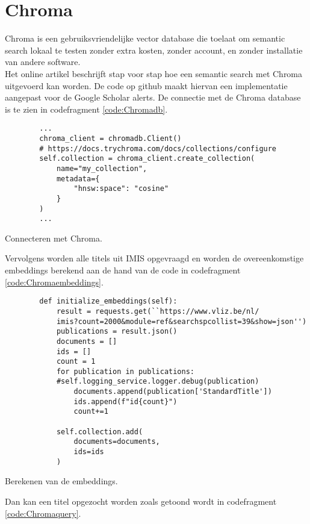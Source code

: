 \section{Chroma}
Chroma \autocite{Chroma2025} is een gebruiksvriendelijke vector database die toelaat om semantic search lokaal te testen zonder extra kosten, zonder account, en zonder installatie van andere software.\\
Het online artikel \textcite{Usechroma2025} beschrijft stap voor stap hoe een semantic search met Chroma uitgevoerd kan worden. 
De code op github \textcite{Depaepechroma2025} maakt hiervan een implementatie aangepast voor de Google Scholar alerts.
De connectie met de Chroma database is te zien in codefragment \ref{code:Chromadb}.
\begin{listing}
    \begin{verbatim}
        ...
        chroma_client = chromadb.Client()
        # https://docs.trychroma.com/docs/collections/configure
        self.collection = chroma_client.create_collection(
            name="my_collection",
            metadata={
                "hnsw:space": "cosine"
            }
        )
        ...
    \end{verbatim}
    \caption[Connect Chroma]{Connecteren met Chroma.}
    \label{code:Chromadb}
\end{listing}
Vervolgens worden alle titels uit IMIS opgevraagd en worden de overeenkomstige embeddings berekend aan de hand van de code in codefragment \ref{code:Chromaembeddings}.
\begin{listing}
    \begin{verbatim}
        def initialize_embeddings(self):
            result = requests.get(``https://www.vliz.be/nl/
            imis?count=2000&module=ref&searchspcollist=39&show=json'')
            publications = result.json()
            documents = []
            ids = []
            count = 1
            for publication in publications:
            #self.logging_service.logger.debug(publication)
                documents.append(publication['StandardTitle'])
                ids.append(f"id{count}")
                count+=1
        
            self.collection.add(
                documents=documents,
                ids=ids
            )
    \end{verbatim}
    \caption[Chroma embeddings]{Berekenen van de embeddings.}
    \label{code:Chromaembeddings}
\end{listing}
Dan kan een titel opgezocht worden zoals getoond wordt in codefragment \ref{code:Chromaquery}.
